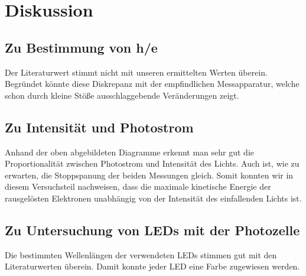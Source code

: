 \documentclass{scrartcl}
\begin{document}
\section{Diskussion}
	\subsection{Zu Bestimmung von h/e}
	Der Literaturwert stimmt nicht mit unseren ermittelten Werten überein. Begründet könnte diese 		    Diskrepanz mit der empfindlichen Messapparatur, welche schon durch kleine Stöße ausschlaggebende
	Veränderungen zeigt. 
	
	\subsection{Zu Intensität und Photostrom}
	Anhand der oben abgebildeten Diagramme erkennt man sehr gut die Proportionalität zwischen       		Photostrom und Intensität des Lichts. Auch ist, wie zu erwarten, die Stoppspanung der beiden 		    Messungen gleich. Somit konnten wir in diesem Versuchsteil nachweisen, dass die maximale    kinetische Energie der rausgelösten Elektronen unabhängig von der Intensität des einfallenden Lichts  ist.
	
	\subsection{Zu Untersuchung von LEDs mit der Photozelle}
	Die bestimmten Wellenlängen der verwendeten LEDs stimmen gut mit den Literaturwerten überein. Damit konnte jeder LED eine Farbe zugewiesen werden.




\end{document}
